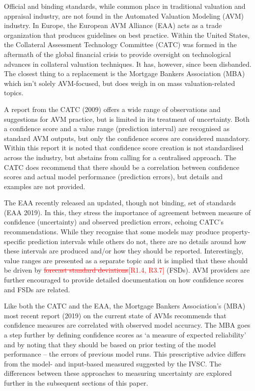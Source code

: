 \documentclass[colTwo]{anon}
\theoremstyle{definition}
\begin{document}
Official and binding standards, while common place in traditional valuation and appraisal industry, are not found in the Automated Valuation Modeling (AVM) industry.  In Europe, the European AVM Alliance (EAA) acts as a trade organization that produces guidelines on best practice.  Within the United States, the Collateral Assessment Technology Committee (CATC) was formed in the aftermath of the global financial crisis to provide oversight on technological advances in collateral valuation techniques. It has, however, since been disbanded.  The closest thing to a replacement is the Mortgage Bankers Association (MBA) which isn’t solely AVM-focused, but does weigh in on mass valuation-related topics.  

A report from the CATC (2009) offers a wide range of observations and suggestions for AVM practice, but is limited in its treatment of uncertainty.  Both a confidence score and a value range (prediction interval) are recognised as standard AVM outputs, but only the confidence scores are considered mandatory.  Within this report it is noted that confidence score creation is not standardised across the industry, but abstains from calling for a centralised approach.  The CATC does recommend that there should be a correlation between confidence scores and actual model performance (prediction errors), but details and examples are not provided. 

The EAA recently released an updated, though not binding, set of standards (EAA 2019). In this, they stress the importance of agreement between measure of confidence (uncertainty) and observed prediction errors, echoing CATC’s recommendations.  While they recognise that some models may produce property-specific prediction intervals while others do not, there are no details around how these intervals are produced and/or how they should be reported.  Interestingly, value ranges are presented as a separate topic and it is implied that these should be driven by \textcolor{red}{\st{forecast standard deviations}[R1.4, R3.7]} (FSDs).  AVM providers are further encouraged to provide detailed documentation on how confidence scores and FSDs are related.  

Like both the CATC and the EAA, the Mortgage Bankers Association’s (MBA) most recent report (2019) on the current state of AVMs recommends that confidence measures are correlated with observed model accuracy.  The MBA goes a step further by defining confidence scores as ‘a measure of expected reliability’ and by noting that they should be based on prior testing of the model performance -- the errors of previous model runs.  This prescriptive advice differs from the model- and input-based measured suggested by the IVSC.  The differences between these approaches to measuring uncertainty are explored further in the subsequent sections of this paper.
\end{document}
